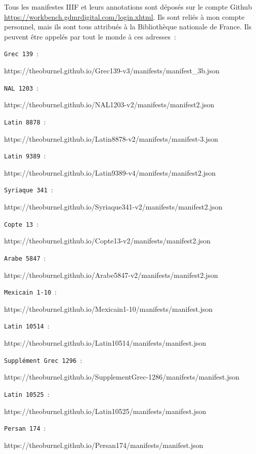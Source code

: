 Tous les manifestes IIIF et leurs annotations sont déposés sur le compte Github \url{https://workbench.gdmrdigital.com/login.xhtml}. Ils sont reliés à mon compte personnel, mais ils sont tous attribués à la Bibliothèque nationale de France. Ils peuvent être appelés par tout le monde à ces adresses~:\\\par
\texttt{Grec 139}~:\par
https://theoburnel.github.io/Grec139-v3/manifests/manifest\_3b.json\\\par
\texttt{NAL 1203}~:\par
https://theoburnel.github.io/NAL1203-v2/manifests/manifest2.json\\\par
\texttt{Latin 8878}~:\par
https://theoburnel.github.io/Latin8878-v2/manifests/manifest-3.json\\\par
\texttt{Latin 9389}~:\par
https://theoburnel.github.io/Latin9389-v4/manifests/manifest2.json\\\par
\texttt{Syriaque 341}~:\par
https://theoburnel.github.io/Syriaque341-v2/manifests/manifest2.json\\\par
\texttt{Copte 13}~:\par
https://theoburnel.github.io/Copte13-v2/manifests/manifest2.json\\\par
\texttt{Arabe 5847}~:\par
https://theoburnel.github.io/Arabe5847-v2/manifests/manifest2.json\\\par
\texttt{Mexicain 1-10}~:\par
https://theoburnel.github.io/Mexicain1-10/manifests/manifest.json\\\par
\texttt{Latin 10514}~:\par
https://theoburnel.github.io/Latin10514/manifests/manifest.json\\\par
\texttt{Supplément Grec 1296}~:\par
https://theoburnel.github.io/SupplementGrec-1286/manifests/manifest.json\\\par
\texttt{Latin 10525}~:\par
https://theoburnel.github.io/Latin10525/manifests/manifest.json\\\par
\texttt{Persan 174}~:\par
https://theoburnel.github.io/Persan174/manifests/manifest.json